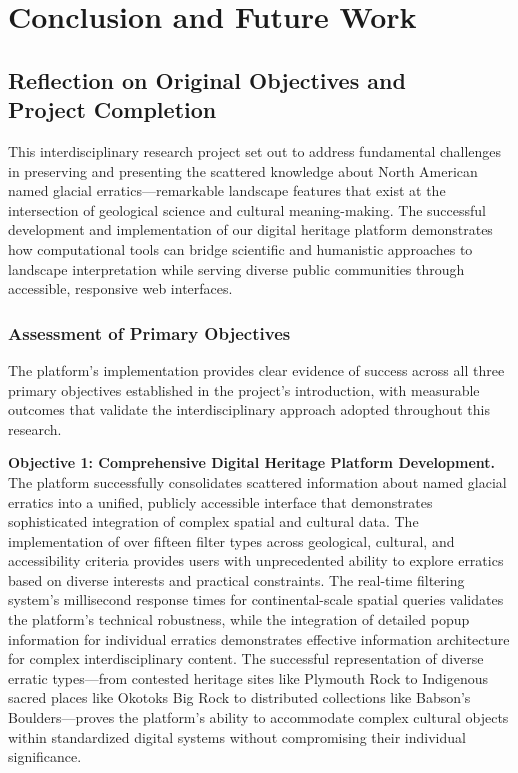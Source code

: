 \chapter{Conclusion and Future Work}
\label{chapter:conclusion}

\section{Reflection on Original Objectives and \\ Project Completion}
\label{sec:objective_reflection}

This interdisciplinary research project set out to address fundamental challenges in preserving and presenting the scattered knowledge about North American named glacial erratics—remarkable landscape features that exist at the intersection of geological science and cultural meaning-making. The successful development and implementation of our digital heritage platform demonstrates how computational tools can bridge scientific and humanistic approaches to landscape interpretation while serving diverse public communities through accessible, responsive web interfaces.

\subsection{Assessment of Primary Objectives}
\label{subsec:objective_assessment}

The platform's implementation provides clear evidence of success across all three primary objectives established in the project's introduction, with measurable outcomes that validate the interdisciplinary approach adopted throughout this research.

\textbf{Objective 1: Comprehensive Digital Heritage Platform Development.} The platform successfully consolidates scattered information about named glacial erratics into a unified, publicly accessible interface that demonstrates sophisticated integration of complex spatial and cultural data. The implementation of over fifteen filter types across geological, cultural, and accessibility criteria provides users with unprecedented ability to explore erratics based on diverse interests and practical constraints. The real-time filtering system's millisecond response times for continental-scale spatial queries validates the platform's technical robustness, while the integration of detailed popup information for individual erratics demonstrates effective information architecture for complex interdisciplinary content. The successful representation of diverse erratic types—from contested heritage sites like Plymouth Rock to Indigenous sacred places like Okotoks Big Rock to distributed collections like Babson's Boulders—proves the platform's ability to accommodate complex cultural objects within standardized digital systems without compromising their individual significance.

